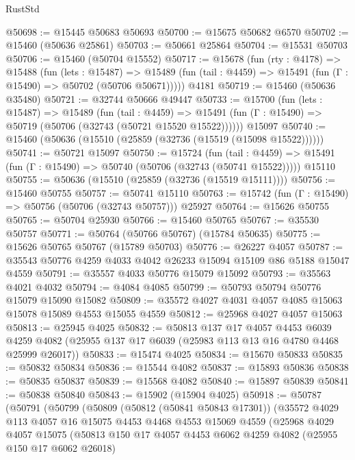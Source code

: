 \begin{lexlean}{RustStd}
\begin{coremodule}
@50698 := @15445 @50683 @50693
@50700 := @15675 @50682 @6570
@50702 := @15460 (@50636 @25861)
@50703 := @50661 @25864
@50704 := @15531 @50703
@50706 := @15460 (@50704 @15552)
@50717 := @15678
    (fun (rty : @4178) =>
    @15488
      (fun (lets : @15487) =>
      @15489 (fun (tail : @4459) => @15491 (fun (Γ : @15490) => @50702 (@50706 @50671)))))
    @4181
@50719 := @15460 (@50636 @35480)
@50721 := @32744 @50666 @49447
@50733 := @15700
    (fun (lets : @15487) =>
    @15489
      (fun (tail : @4459) =>
      @15491 (fun (Γ : @15490) => @50719 (@50706 (@32743 (@50721 @15520 @15522))))))
    @15097
@50740 := @15460 (@50636 (@15510 (@25859 (@32736 (@15519 (@15098 @15522))))))
@50741 := @50721 @15097
@50750 := @15724
    (fun (tail : @4459) => @15491 (fun (Γ : @15490) => @50740 (@50706 (@32743 (@50741 @15522)))))
    @15110
@50755 := @50636 (@15510 (@25859 (@32736 (@15519 @15111))))
@50756 := @15460 @50755
@50757 := @50741 @15110
@50763 := @15742 (fun (Γ : @15490) => @50756 (@50706 (@32743 @50757))) @25927
@50764 := @15626 @50755
@50765 := @50704 @25930
@50766 := @15460 @50765
@50767 := @35530 @50757
@50771 := @50764 (@50766 @50767) (@15784 @50635)
@50775 := @15626 @50765 @50767 (@15789 @50703)
@50776 := @26227 @4057
@50787 := @35543 @50776 @4259 @4033 @4042 @26233 @15094 @15109 @86 @5188 @15047 @4559
@50791 := @35557 @4033 @50776 @15079 @15092
@50793 := @35563 @4021 @4032
@50794 := @4084 @4085
@50799 := @50793 @50794 @50776 @15079 @15090 @15082
@50809 := @35572 @4027 @4031 @4057 @4085 @15063 @15078 @15089 @4553 @15055 @4559
@50812 := @25968 @4027 @4057 @15063
@50813 := @25945 @4025
@50832 := @50813
    @137
    @17
    @4057
    @4453
    @6039
    @4259
    @4082
    (@25955 @137 @17 @6039 (@25983 @113 @13 @16 @4780 @4468 @25999 @26017))
@50833 := @15474 @4025
@50834 := @15670 @50833
@50835 := @50832 @50834
@50836 := @15544 @4082
@50837 := @15893 @50836
@50838 := @50835 @50837
@50839 := @15568 @4082
@50840 := @15897 @50839
@50841 := @50838 @50840
@50843 := @15902 (@15904 @4025)
@50918 := @50787
    (@50791
      (@50799
        (@50809
          (@50812 (@50841 @50843 @17301))
          (@35572
            @4029
            @113
            @4057
            @16
            @15075
            @4453
            @4468
            @4553
            @15069
            @4559
            (@25968
              @4029
              @4057
              @15075
              (@50813
                @150
                @17
                @4057
                @4453
                @6062
                @4259
                @4082
                (@25955 @150 @17 @6062 @26018)

\end{coremodule}
\end{lexlean}
